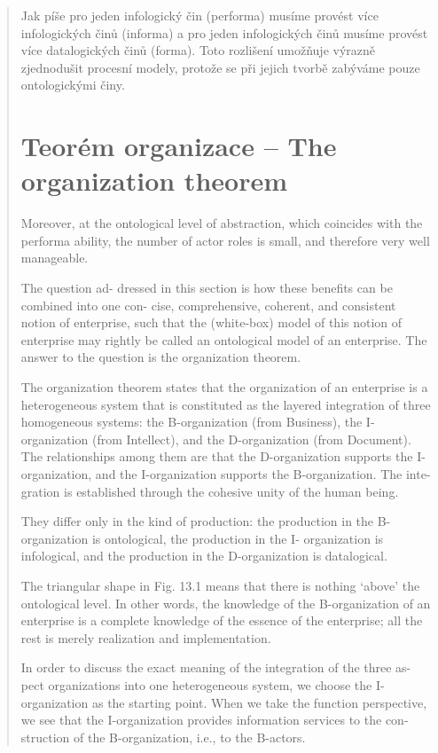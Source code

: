 \documentclass[]{article}
\begin{document}
\begin{quote}
Jak píše \cite{Vejrazkova2013} pro jeden infologický čin (performa) musíme provést více infologických činů (informa) a pro jeden infologických činů musíme provést více datalogických činů (forma). Toto rozlišení umožňuje výrazně zjednodušit procesní modely, protože se při jejich tvorbě zabýváme pouze ontologickými činy.

\section{Teorém organizace – The organization theorem}

Moreover, at the ontological level of abstraction, which coincides with the performa ability, the number of actor roles is small, and therefore very well manageable.

The question ad- dressed in this section is how these benefits can be combined into one con- cise, comprehensive, coherent, and consistent notion of enterprise, such that the (white-box) model of this notion of enterprise may rightly be called an ontological model of an enterprise. The answer to the question is the organization theorem.

The organization theorem states that the organization of an enterprise is a heterogeneous system that is constituted as the layered integration of three homogeneous systems: the B-organization (from Business), the I- organization (from Intellect), and the D-organization (from Document). The relationships among them are that the D-organization supports the I- organization, and the I-organization supports the B-organization. The inte- gration is established through the cohesive unity of the human being.

They differ only in the kind of production: the production in the B-organization is ontological, the production in the I- organization is infological, and the production in the D-organization is datalogical.


The triangular shape in Fig. 13.1 means that there is nothing ‘above’ the ontological level. In other words, the knowledge of the B-organization of an enterprise is a complete knowledge of the essence of the enterprise; all the rest is merely realization and implementation.

In order to discuss the exact meaning of the integration of the three as- pect organizations into one heterogeneous system, we choose the I- organization as the starting point. When we take the function perspective, we see that the I-organization provides information services to the con- struction of the B-organization, i.e., to the B-actors.


\end{quote}
\end{document}
